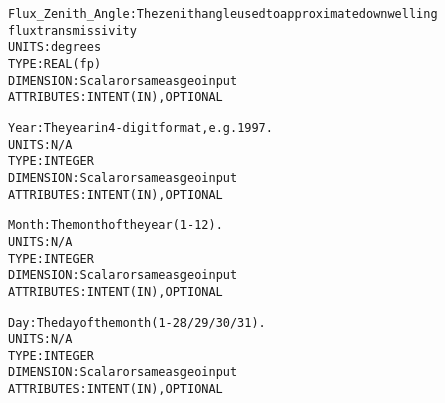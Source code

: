\begin{alltt}
        Flux_Zenith_Angle:    The zenith angle used to approximate downwelling
                              flux transmissivity
                              UNITS:      degrees
                              TYPE:       REAL(fp)
                              DIMENSION:  Scalar or same as geo input
                              ATTRIBUTES: INTENT(IN), OPTIONAL
 
        Year:                 The year in 4-digit format, e.g. 1997.
                              UNITS:      N/A
                              TYPE:       INTEGER
                              DIMENSION:  Scalar or same as geo input
                              ATTRIBUTES: INTENT(IN), OPTIONAL
 
        Month:                The month of the year (1-12).
                              UNITS:      N/A
                              TYPE:       INTEGER
                              DIMENSION:  Scalar or same as geo input
                              ATTRIBUTES: INTENT(IN), OPTIONAL
 
        Day:                  The day of the month (1-28/29/30/31).
                              UNITS:      N/A
                              TYPE:       INTEGER
                              DIMENSION:  Scalar or same as geo input
                              ATTRIBUTES: INTENT(IN), OPTIONAL
 
  \end{alltt}
